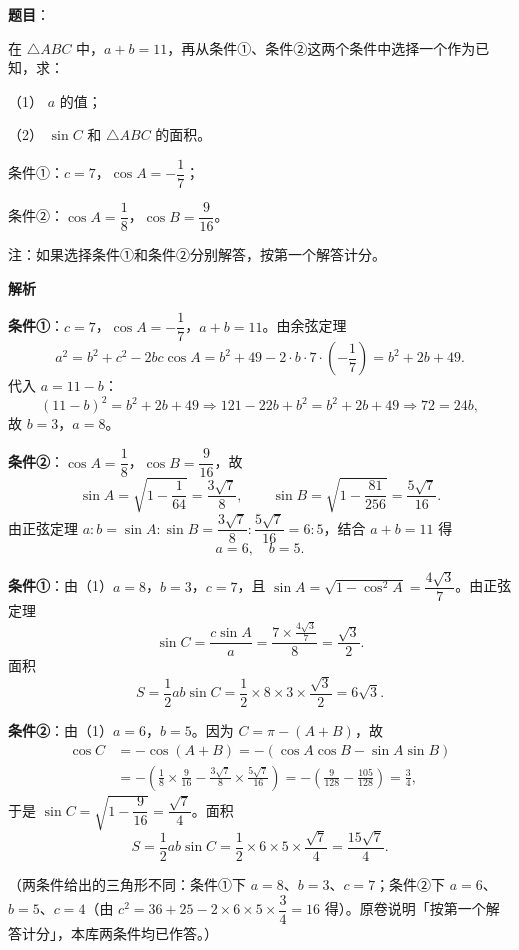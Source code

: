 \begin{answer}

\textbf{题目}：

在 $\triangle ABC$ 中，$a+b=11$，再从条件①、条件②这两个条件中选择一个作为已知，求：

（1） $a$ 的值；

（2） $\sin C$ 和 $\triangle ABC$ 的面积。

条件①：$c=7$，$\cos A=-\dfrac17$；

条件②：$\cos A=\dfrac18$，$\cos B=\dfrac9{16}$。

注：如果选择条件①和条件②分别解答，按第一个解答计分。

\textbf{解析}


\textbf{条件①}：$c=7$，$\cos A=-\dfrac17$，$a+b=11$。由余弦定理
\nopagebreak[4]
\[a^2=b^2+c^2-2bc\cos A=b^2+49-2\cdot b\cdot7\cdot\left(-\frac17\right)=b^2+2b+49 .\]
代入 $a=11-b$：
\nopagebreak[4]
\[(11-b)^2=b^2+2b+49\Longrightarrow121-22b+b^2=b^2+2b+49\Longrightarrow72=24b,\]
故 $b=3$，$a=8$。

\textbf{条件②}：$\cos A=\dfrac18$，$\cos B=\dfrac9{16}$，故
\nopagebreak[4]
\[\sin A=\sqrt{1-\frac1{64}}=\frac{3\sqrt7}8,\qquad \sin B=\sqrt{1-\frac{81}{256}}=\frac{5\sqrt7}{16}.\]
由正弦定理 $a:b=\sin A:\sin B=\dfrac{3\sqrt7}8:\dfrac{5\sqrt7}{16}=6:5$，结合 $a+b=11$ 得
\nopagebreak[4]
\[a=6,\quad b=5 .\]


\textbf{条件①}：由（1）$a=8$，$b=3$，$c=7$，且 $\sin A=\sqrt{1-\cos^2A}=\dfrac{4\sqrt3}7$。由正弦定理
\nopagebreak[4]
\[\sin C=\frac{c\sin A}{a}=\frac{7\times\frac{4\sqrt3}7}{8}=\frac{\sqrt3}2 .\]
面积
\nopagebreak[4]
\[S=\frac12ab\sin C=\frac12\times8\times3\times\frac{\sqrt3}2=6\sqrt3 .\]

\textbf{条件②}：由（1）$a=6$，$b=5$。因为 $C=\pi-(A+B)$，故
\nopagebreak[4]
\[\begin{aligned}
\cos C&=-\cos(A+B)=-\left(\cos A\cos B-\sin A\sin B\right)\\
&=-\left(\frac18\times\frac9{16}-\frac{3\sqrt7}8\times\frac{5\sqrt7}{16}\right)
=-\left(\frac9{128}-\frac{105}{128}\right)=\frac34,
\end{aligned}\]
于是 $\sin C=\sqrt{1-\dfrac9{16}}=\dfrac{\sqrt7}4$。面积
\nopagebreak[4]
\[S=\frac12ab\sin C=\frac12\times6\times5\times\frac{\sqrt7}4=\frac{15\sqrt7}4 .\]

（两条件给出的三角形不同：条件①下 $a=8$、$b=3$、$c=7$；条件②下 $a=6$、$b=5$、$c=4$（由 $c^2=36+25-2\times6\times5\times\dfrac34=16$ 得）。原卷说明「按第一个解答计分」，本库两条件均已作答。）



\end{answer}
